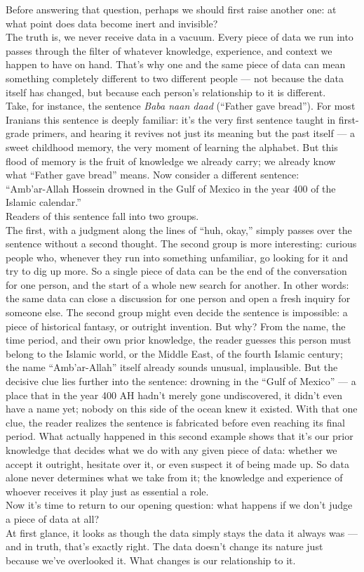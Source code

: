 Before answering that question, perhaps we should first raise another one: at what point does data become inert and invisible?\\
The truth is, we never receive data in a vacuum. Every piece of data we run into passes through the filter of whatever knowledge, experience, and context we happen to have on hand. That's why one and the same piece of data can mean something completely different to two different people --- not because the data itself has changed, but because each person's relationship to it is different.\\
Take, for instance, the sentence \textit{Baba naan daad} (``Father gave bread''). For most Iranians this sentence is deeply familiar: it's the very first sentence taught in first-grade primers, and hearing it revives not just its meaning but the past itself --- a sweet childhood memory, the very moment of learning the alphabet. But this flood of memory is the fruit of knowledge we already carry; we already know what ``Father gave bread'' means. Now consider a different sentence:\\
``Amb'ar-Allah Hossein drowned in the Gulf of Mexico in the year 400 of the Islamic calendar.''\\
Readers of this sentence fall into two groups.\\
The first, with a judgment along the lines of ``huh, okay,'' simply passes over the sentence without a second thought. The second group is more interesting: curious people who, whenever they run into something unfamiliar, go looking for it and try to dig up more. So a single piece of data can be the end of the conversation for one person, and the start of a whole new search for another. In other words: the same data can close a discussion for one person and open a fresh inquiry for someone else.
The second group might even decide the sentence is impossible: a piece of historical fantasy, or outright invention. But why? From the name, the time period, and their own prior knowledge, the reader guesses this person must belong to the Islamic world, or the Middle East, of the fourth Islamic century; the name ``Amb'ar-Allah'' itself already sounds unusual, implausible. But the decisive clue lies further into the sentence: drowning in the ``Gulf of Mexico'' --- a place that in the year 400 AH hadn't merely gone undiscovered, it didn't even have a name yet; nobody on this side of the ocean knew it existed. With that one clue, the reader realizes the sentence is fabricated before even reaching its final period. What actually happened in this second example shows that it's our prior knowledge that decides what we do with any given piece of data: whether we accept it outright, hesitate over it, or even suspect it of being made up. So data alone never determines what we take from it; the knowledge and experience of whoever receives it play just as essential a role.\\
Now it's time to return to our opening question: what happens if we don't judge a piece of data at all?\\
At first glance, it looks as though the data simply stays the data it always was --- and in truth, that's exactly right. The data doesn't change its nature just because we've overlooked it. What changes is our relationship to it.

